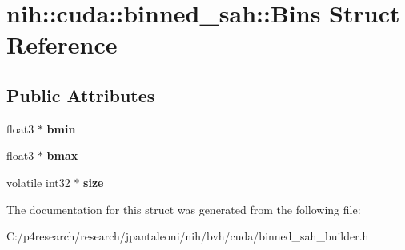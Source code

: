 \hypertarget{structnih_1_1cuda_1_1binned__sah_1_1_bins}{
\section{nih\-:\-:cuda\-:\-:binned\-\_\-sah\-:\-:\-Bins \-Struct \-Reference}
\label{structnih_1_1cuda_1_1binned__sah_1_1_bins}
}
\subsection*{\-Public \-Attributes}
\begin{DoxyCompactItemize}
\item 
\hypertarget{structnih_1_1cuda_1_1binned__sah_1_1_bins_af7889584471558c956563c5730f164c3}{
float3 $\ast$ {\bfseries bmin}}
\label{structnih_1_1cuda_1_1binned__sah_1_1_bins_af7889584471558c956563c5730f164c3}

\item 
\hypertarget{structnih_1_1cuda_1_1binned__sah_1_1_bins_a5c137083661b5ccbbe2d9be2a2ebeec1}{
float3 $\ast$ {\bfseries bmax}}
\label{structnih_1_1cuda_1_1binned__sah_1_1_bins_a5c137083661b5ccbbe2d9be2a2ebeec1}

\item 
\hypertarget{structnih_1_1cuda_1_1binned__sah_1_1_bins_a3bd6e9ce57e1b2020a1a342a4a49112b}{
volatile int32 $\ast$ {\bfseries size}}
\label{structnih_1_1cuda_1_1binned__sah_1_1_bins_a3bd6e9ce57e1b2020a1a342a4a49112b}

\end{DoxyCompactItemize}


\-The documentation for this struct was generated from the following file\-:\begin{DoxyCompactItemize}
\item 
\-C\-:/p4research/research/jpantaleoni/nih/bvh/cuda/binned\-\_\-sah\-\_\-builder.\-h\end{DoxyCompactItemize}
